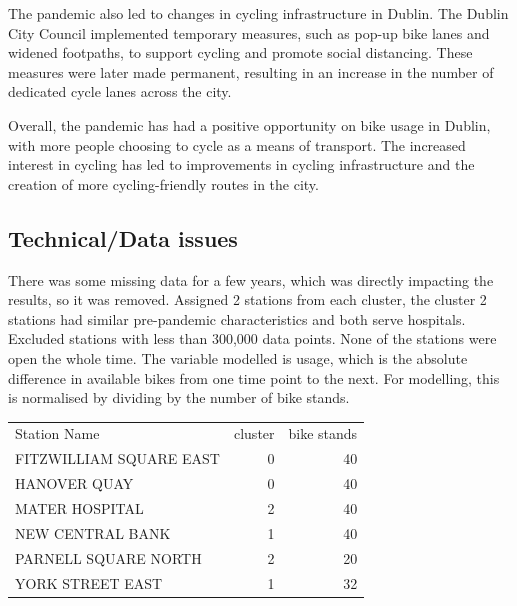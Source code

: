 \documentclass[11pt, singlecolumn, citestyle=authoryear]{elegantbook}
\begin{document}
The pandemic also led to changes in cycling infrastructure in Dublin. The Dublin City Council implemented temporary measures, such as pop-up bike lanes and widened footpaths, to support cycling and promote social distancing. These measures were later made permanent, resulting in an increase in the number of dedicated cycle lanes across the city.

Overall, the pandemic has had a positive opportunity  on bike usage in Dublin, with more people choosing to cycle as a means of transport. The increased interest in cycling has led to improvements in cycling infrastructure and the creation of more cycling-friendly routes in the city.



	
\subsection*{Technical/Data issues}
There was some missing data for a few years, which was directly impacting the results, so it was removed. Assigned 2 stations from each cluster, the cluster 2 stations had similar pre-pandemic characteristics and both serve hospitals. Excluded stations with less than 300,000 data points.   None of the stations were open the whole time. The variable modelled is usage, which is the absolute difference in available bikes from one time point to the next.  For modelling, this is normalised by dividing by the number of bike stands.



\begin{table}[h]
	\begin{tabular}{|l|r|r|}
		Station Name & cluster & bike stands\\
		FITZWILLIAM SQUARE EAST & 0 & 40\\
		HANOVER QUAY & 0 & 40\\
		MATER HOSPITAL & 2 & 40\\
		NEW CENTRAL BANK & 1 & 40 \\
		PARNELL SQUARE NORTH & 2 & 20\\
		YORK STREET EAST & 1 & 32 \\
		
	\end{tabular} 
\end{table}
\end{document}
